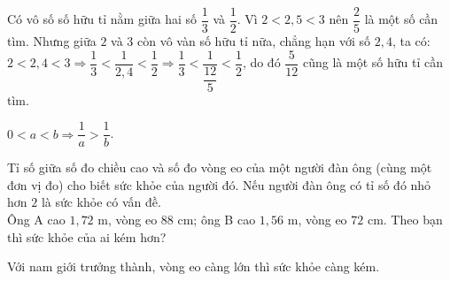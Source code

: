 \begin{note}
	Có vô số số hữu tỉ nằm giữa hai số $\dfrac{1}{3}$ và $\dfrac{1}{2}$. Vì $2<2,5<3$ nên $\dfrac{2}{5}$ là một số cần tìm. Nhưng giữa $2$ và $3$ còn vô vàn  số hữu tỉ nữa, chẳng hạn với số $2,4$, ta có: \\
	$2<2,4<3 \Rightarrow \dfrac{1}{3}<\dfrac{1}{2,4}<\dfrac{1}{2} \Rightarrow \dfrac{1}{3}<\dfrac{1}{\dfrac{12}{5}}<\dfrac{1}{2}$, do đó $\dfrac{5}{12}$ cũng là một số hữu tỉ cần tìm.
\end{note}
\begin{note}
	$0<a<b \Rightarrow \dfrac{1}{a} > \dfrac{1}{b}$.
\end{note}
\begin{vd}%
	Tỉ số giữa số đo chiều cao và số đo vòng eo của một người đàn ông (cùng một đơn vị đo) cho biết sức khỏe của người đó. Nếu người đàn ông có tỉ số đó nhỏ hơn $2$ là sức khỏe có vấn đề. \\
	Ông A cao $1,72$ m, vòng eo $88$ cm; ông B cao $1,56$ m, vòng eo $72$ cm. Theo bạn thì sức khỏe của ai kém hơn?
	\begin{note}
		Với nam giới trưởng thành, vòng eo càng lớn thì sức khỏe càng kém.
	\end{note}
\end{vd}
